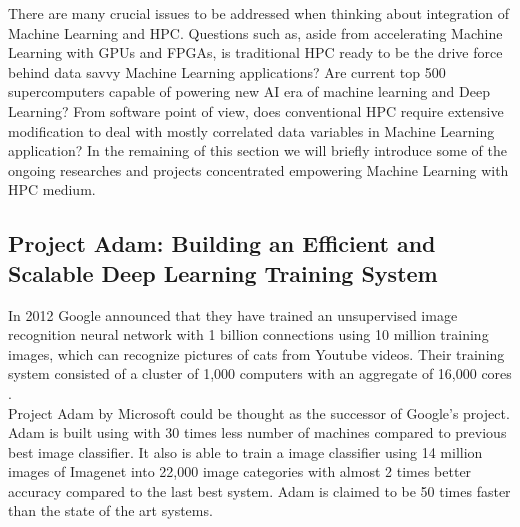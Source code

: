 \documentclass[runningheads,a4paper]{llncs}
\begin{document}
{There are many crucial issues to be addressed when thinking about integration of Machine Learning and HPC. Questions such as, aside from accelerating Machine Learning with GPUs and FPGAs, is traditional HPC ready to be the drive force behind data savvy Machine Learning applications? Are current top 500 supercomputers capable of powering new AI era of machine learning and Deep Learning? From software point of view, does conventional HPC require extensive modification to deal with mostly correlated data variables in Machine Learning application?
In the remaining of this section we will briefly introduce some of the ongoing researches and projects concentrated empowering Machine Learning with HPC medium.

\subsection*{Project Adam: Building an Efficient and Scalable Deep Learning Training System \cite{chilimbi2014project}}
In 2012 Google announced that they have trained an unsupervised image recognition neural network with 1 billion connections using 10 million training images, which can recognize pictures of cats from Youtube videos. Their training system consisted of a cluster of 1,000 computers with an aggregate of 16,000 cores \cite{le2013building}.\\

Project Adam by Microsoft could be thought as the successor of Google's project. Adam is built using with 30 times less number of machines compared to previous best image classifier. It also is able to train a image classifier using 14 million images of Imagenet \cite{deng2009imagenet} into 22,000 image categories with almost 2 times better accuracy compared to the last best system. Adam is claimed to be 50 times faster than the state of the art systems.\\

}
\end{document}
